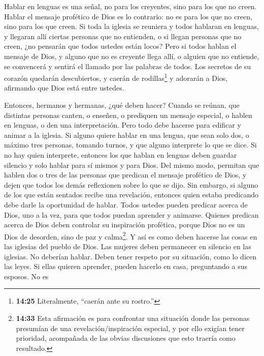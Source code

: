  Hablar en lenguas es una señal, no para los creyentes,
sino para los que no creen. Hablar el mensaje profético de Dios es lo
contrario: no es para los que no creen, sino para los que creen.
 Si toda la iglesia se reuniera y todos hablaran en
lenguas, y llegaran allí ciertas personas que no entienden, o si llegan
personas que no creen, ¿no pensarán que todos ustedes están locos?
 Pero si todos hablan el mensaje de Dios, y alguno que no
es creyente llega allí, o alguien que no entiende, se convencerá y
sentirá el llamado por las palabras de todos.  Los secretos
de su corazón quedarán descubiertos, y caerán de rodillas\footnote{\textbf{14:25}
  Literalmente, ``caerán ante su rostro.''} y adorarán a Dios, afirmando
que Dios está entre ustedes.

 Entonces, hermanos y hermanas, ¿qué deben hacer? Cuando se
reúnan, que distintas personas canten, o enseñen, o prediquen un mensaje
especial, o hablen en lenguas, o den una interpretación. Pero todo debe
hacerse para edificar y animar a la iglesia.  Si alguno
quiere hablar en una lengua, que sean solo dos, o máximo tres personas,
tomando turnos, y que alguno interprete lo que se dice.  Si
no hay quien interprete, entonces los que hablan en lenguas deben
guardar silencio y solo hablar para sí mismos y para Dios. 
Del mismo modo, permitan que hablen dos o tres de las personas que
predican el mensaje profético de Dios, y dejen que todos los demás
reflexionen sobre lo que se dijo.  Sin embargo, si alguno
de los que están sentados recibe una revelación, entonces quien estaba
predicando debe darle la oportunidad de hablar.  Todos
ustedes pueden predicar acerca de Dios, uno a la vez, para que todos
puedan aprender y animarse.  Quienes predican acerca de
Dios deben controlar su inspiración profética,  porque Dios
no es un Dios de desorden, sino de paz y calma\footnote{\textbf{14:33}
  Esta afirmación es para confrontar una situación donde las personas
  presumían de una revelación/inspiración especial, y por ello exigían
  tener prioridad, acompañada de las obvias discusiones que esto traería
  como resultado.}. Y así es como deben hacerse las cosas en las
iglesias del pueblo de Dios.  Las mujeres deben permanecer
en silencio en las iglesias. No deberían hablar. Deben tener respeto por
su situación, como lo dicen las leyes.  Si ellas quieren
aprender, pueden hacerlo en casa, preguntando a sus esposos. No es

